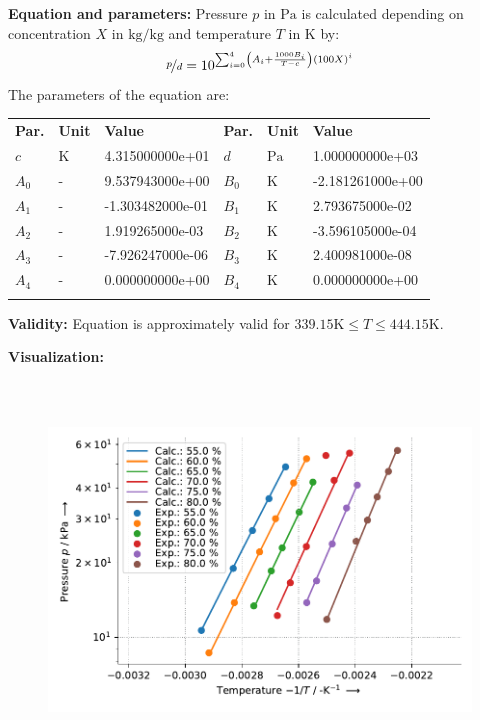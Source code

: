\textbf{Equation and parameters:}
\newline
%
Pressure $p$ in $\si{\pascal}$ is calculated depending on concentration $X$ in $\si{\kilogram\per\kilogram}$ and  temperature $T$ in $\si{\kelvin}$ by:
%
\begin{equation*}
\nicefrac{p}{d} = 10 ^ { \sum_{i=0}^{4} \left( A_i + \frac{1000 B_i}{T - c} \right) \left( 100 X \right) ^{i}}
\end{equation*}
%
The parameters of the equation are:
%
\begin{longtable}[l]{lll|lll}
\toprule
\addlinespace
\textbf{Par.} & \textbf{Unit} & \textbf{Value} &	\textbf{Par.} & \textbf{Unit} & \textbf{Value} \\
\addlinespace
\midrule
\endhead

\bottomrule
\endfoot
\bottomrule
\endlastfoot
\addlinespace

$c$ & $\si{\kelvin}$ & 4.315000000e+01 & $d$ & $\si{\pascal}$ & 1.000000000e+03 \\
$A_0$ & - & 9.537943000e+00 & $B_0$ & $\si{\kelvin}$ & -2.181261000e+00 \\
$A_1$ & - & -1.303482000e-01 & $B_1$ & $\si{\kelvin}$ & 2.793675000e-02 \\
$A_2$ & - & 1.919265000e-03 & $B_2$ & $\si{\kelvin}$ & -3.596105000e-04 \\
$A_3$ & - & -7.926247000e-06 & $B_3$ & $\si{\kelvin}$ & 2.400981000e-08 \\
$A_4$ & - & 0.000000000e+00 & $B_4$ & $\si{\kelvin}$ & 0.000000000e+00 \\

\addlinespace\end{longtable}

\textbf{Validity:}
\newline
Equation is approximately valid for $339.15 \si{\kelvin} \leq T \leq 444.15 \si{\kelvin}$.
\newline

\textbf{Visualization:}
%
\begin{figure}[!htp]
{\noindent\includegraphics[height=10cm, keepaspectratio]{figs/abs/abs_Water_LiBr_LiI-OH(CH2)3OH_massRatio_174_57_15_Antoine_1.pdf}}
\end{figure}
%

